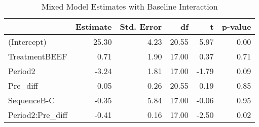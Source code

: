 \begin{table}

\caption{\label{tab:proteinDataEstimates}Mixed Model Estimates with Baseline Interaction}
\centering
\begin{tabular}[t]{>{}l|rrrrr}
\toprule
 & Estimate & Std. Error & df & t & p-value\\
\midrule
(Intercept) & 25.30 & 4.23 & 20.55 & 5.97 & 0.00\\
TreatmentBEEF & 0.71 & 1.90 & 17.00 & 0.37 & 0.71\\
Period2 & -3.24 & 1.81 & 17.00 & -1.79 & 0.09\\
Pre\_diff & 0.05 & 0.26 & 20.55 & 0.19 & 0.85\\
SequenceB-C & -0.35 & 5.84 & 17.00 & -0.06 & 0.95\\
\addlinespace
Period2:Pre\_diff & -0.41 & 0.16 & 17.00 & -2.50 & 0.02\\
\bottomrule
\end{tabular}
\end{table}
